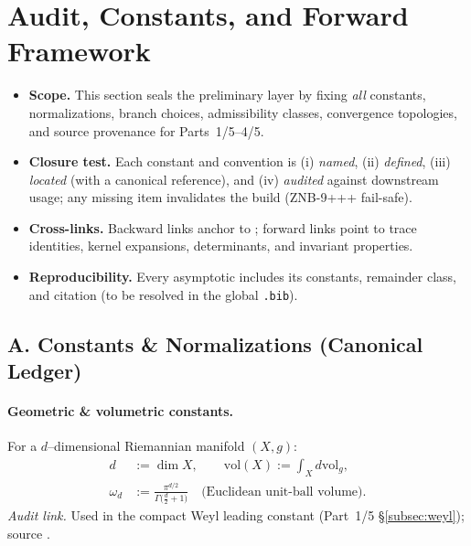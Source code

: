 \section{Audit, Constants, and Forward Framework}
\label{sec:audit-constants-framework}

\begin{tcolorbox}[colback=gray!5,colframe=gray!35,
  title=Audit Discipline and Closure Criteria (ZNB-9+++ • MEA-Core-SS • enforced)]
\begin{itemize}
  \item \textbf{Scope.} This section seals the preliminary layer by fixing \emph{all} constants, normalizations, branch choices,
        admissibility classes, convergence topologies, and source provenance for Parts~1/5–4/5.
  \item \textbf{Closure test.} Each constant and convention is (i) \emph{named}, (ii) \emph{defined}, (iii) \emph{located} (with a canonical reference),
        and (iv) \emph{audited} against downstream usage; any missing item invalidates the build (ZNB-9+++ fail-safe).
  \item \textbf{Cross-links.} Backward links anchor to ;
        forward links point to trace identities, kernel expansions, determinants, and invariant properties.
  \item \textbf{Reproducibility.} Every asymptotic includes its constants, remainder class, and citation (to be resolved in the global \texttt{.bib}).
\end{itemize}
\end{tcolorbox}

\subsection*{A. Constants \& Normalizations (Canonical Ledger)}
\label{subsec:constants}

\paragraph{Geometric \& volumetric constants.}
For a $d$–dimensional Riemannian manifold $(X,g)$:
\begin{align}
  d &:= \dim X, \qquad
  \mathrm{vol}(X) := \int_X d\mathrm{vol}_g, \\
  \omega_d &:= \frac{\pi^{d/2}}{\Gamma\!\big(\frac d2 + 1\big)} 
  \quad\text{(Euclidean unit-ball volume)}. \label{eq:omega-d}
\end{align}
\textit{Audit link.} Used in the compact Weyl leading constant (Part~1/5 \S\ref{subsec:weyl}); source \cite{Hormander1968}.

